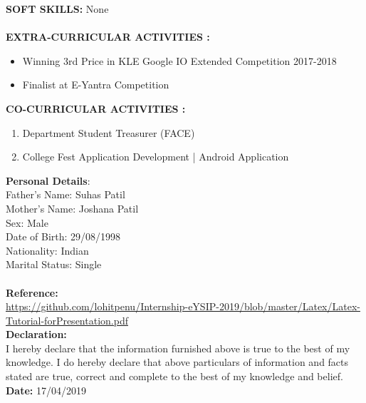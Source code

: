 \documentclass{article}
\begin{document}
\large \textbf{SOFT SKILLS:}	
None\\
\\
\large \textbf{EXTRA-CURRICULAR ACTIVITIES
:}\\
	\begin{itemize}
	\item Winning 3rd Price in KLE Google IO Extended Competition 2017-2018
	\item Finalist at E-Yantra Competition
\end{itemize}
\large \textbf{CO-CURRICULAR ACTIVITIES
:}\\
	\begin{enumerate}
	\item Department Student Treasurer (FACE)
	\item College Fest Application Development | Android Application
\end{enumerate}

\large \textbf{Personal Details}:\\
Father’s Name: Suhas Patil \\
Mother’s Name: Joshana Patil \\
Sex: Male \\
Date of Birth: 29/08/1998 \\
Nationality: Indian \\
Marital Status: Single \\
\\
\large \textbf{Reference:}\\
\href{Link}{https://github.com/lohitpenu/Internship-eYSIP-2019/blob/master/Latex/Latex-Tutorial-forPresentation.pdf} \\	

\large \textbf{Declaration: }\\
I hereby declare that the information furnished above is true to the best of my knowledge. I do hereby declare that above particulars of information and facts stated are true, correct and complete to the best of my knowledge and belief.\\

\large \textbf{Date: } 17/04/2019\\
\end{document}

